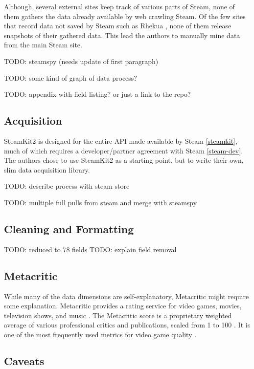 \documentclass[letterpaper,10pt,twocolumn]{article}
\begin{document}
Although, several external sites keep track of various parts of Steam, none of
them gathers the data already available by web crawling Steam. Of the few
sites that record data not saved by Steam such as Rhekua \cite{rhekua}, none
of them release snapshots of their gathered data. This lead the authors to
manually mine data from the main Steam site.

TODO: steamspy (needs update of first paragraph)

TODO: some kind of graph of data process?

TODO: appendix with field listing? or just a link to the repo?

\subsection{Acquisition}

SteamKit2 is designed for the entire API made available by Steam
\ref{steamkit}, much of which requires a developer/partner agreement with
Steam \ref{steam-dev}. The authors chose to use SteamKit2 as a starting point,
but to write their own, slim data acquisition library.

TODO: describe process with steam store

TODO: multiple full pulls from steam and merge with steamspy

\subsection{Cleaning and Formatting}

TODO: reduced to 78 fields
TODO: explain field removal

\subsection{Metacritic}

While many of the data dimensions are self-explanatory, Metacritic might
require some explanation. Metacritic provides a rating service for video
games, movies, television shows, and music \cite{metacritic}. The Metacritic
score is a proprietary weighted average of various professional critics and
publications, scaled from 1 to 100 \cite{metacritic-score}. It is one of the
most frequently used metrics for video game quality \cite{metacritic-vgdominant}.


\subsection{Caveats}
\end{document}
